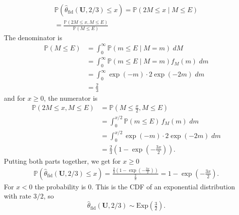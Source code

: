 \begin{align*}
	\mathbb{P} \left( \hat{\theta}_{\text{fid}}(\mathbf{U}, 2/3) \leq x  \right)
	=
	\mathbb{P} \left( 2M \leq x \;\big|\; M \leq E  \right) \\
	=
	\frac{
		\mathbb{P} \left( 2M \leq x , M \leq E  \right)
	}{
		\mathbb{P} \left( M \leq E  \right)
	}
\end{align*}
The denominator is
\begin{align*}
	\mathbb{P} \left( M \leq E  \right) 
	&=
	\int_0^\infty \mathbb{P} (m \leq E \;\big|\; M = m) \; dM \\
	&=
	\int_0^\infty \mathbb{P} (m \leq E \;\big|\; M = m) f_M(m) \; dm \\
	&=
	\int_0^\infty \exp(-m) \cdot 2 \exp(-2m) \; dm \\
	&=
	\frac{2}{3}
\end{align*}
and for $x \geq 0$, the numerator is
\begin{align*}
	\mathbb{P} \left( 2M \leq x , M \leq E  \right)
	&=
	\mathbb{P} \left( M \leq \tfrac{x}{2} , M \leq E  \right) \\
	&=
	\int_0^{x/2} \mathbb{P} (m \leq E) \, f_M(m) \; dm \\
	&=
	\int_0^{x/2} \exp(-m) \cdot 2 \exp(-2m) \; dm \\
	&=
	\frac{2}{3} \left( 1 - \exp\!\left( -\frac{3x}{2} \right) \right).
\end{align*}
Putting both parts together, we get for $x \geq 0$
\begin{align*}
	\mathbb{P} \left( \hat{\theta}_{\text{fid}}(\mathbf{U}, 2/3) \leq x  \right)
	=
	\frac{\frac{2}{3} \left( 1 - \exp\left( -\frac{3x}{2} \right) \right)}{\frac{2}{3}}
	=
	1 - \exp\!\left( -\frac{3x}{2} \right).
\end{align*}
For $x < 0$ the probability is $0$.
This is the CDF of an exponential distribution with rate $3/2$, so
\[
\hat{\theta}_{\text{fid}}(\mathbf{U}, 2/3) \sim \text{Exp}\!\left( \tfrac{3}{2} \right).
\]


